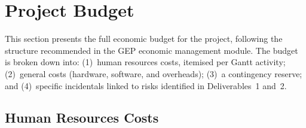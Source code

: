 \documentclass[11pt, a4paper]{article}
\begin{document}
\tableofcontents
\newpage


\section{Project Budget}
\label{sec:budget}

This section presents the full economic budget for the project, following the structure recommended in the GEP economic management module. The budget is broken down into: (1)~human resources costs, itemised per Gantt activity; (2)~general costs (hardware, software, and overheads); (3)~a contingency reserve; and (4)~specific incidentals linked to risks identified in Deliverables~1 and~2.

\subsection{Human Resources Costs}
\label{sec:hr-costs}
\end{document}
